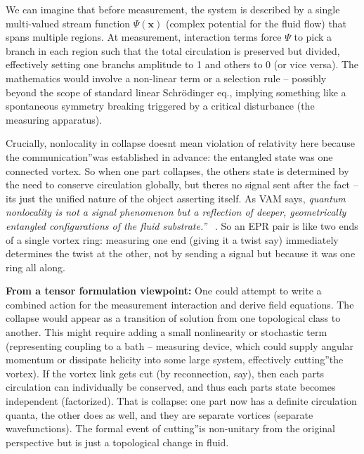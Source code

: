 \documentclass[a4paper, aps,preprint,superscriptaddress, 12pt]{revtex4}
\begin{document}
We can imagine that before measurement, the system is described by a single multi-valued stream function $\Psi(\mathbf{x})$ (complex potential for the fluid flow) that spans multiple regions. At measurement, interaction terms force $\Psi$ to pick a branch in each region such that the total circulation is preserved but divided, effectively setting one branch\rqs s amplitude to 1 and others to 0 (or vice versa). The mathematics would involve a non-linear term or a selection rule – possibly beyond the scope of standard linear Schrödinger eq., implying something like a spontaneous symmetry breaking triggered by a critical disturbance (the measuring apparatus).


Crucially, nonlocality in collapse doesn\rqs t mean violation of relativity here because the \grqq communication\textquotedblright was established in advance: the entangled state was one connected vortex. So when one part collapses, the other\rqs s state is determined by the need to conserve circulation globally, but there\rqs s no signal sent after the fact – it\rqs s just the unified nature of the object asserting itself. As VAM says, \textit{\grqq quantum nonlocality is not a signal phenomenon but a reflection of deeper, geometrically entangled configurations of the fluid substrate.\textquotedblright}~\cite{Iskandarani2025c} . So an EPR pair is like two ends of a single vortex ring: measuring one end (giving it a twist say) immediately determines the twist at the other, not by sending a signal but because it was one ring all along.


\textbf{From a tensor formulation viewpoint:} One could attempt to write a combined action for the measurement interaction and derive field equations. The collapse would appear as a transition of solution from one topological class to another. This might require adding a small nonlinearity or stochastic term (representing coupling to a bath – measuring device, which could supply angular momentum or dissipate helicity into some large system, effectively \grqq cutting\textquotedblright the vortex). If the vortex link gets cut (by reconnection, say), then each part\rqs s circulation can individually be conserved, and thus each part\rqs s state becomes independent (factorized). That is collapse: one part now has a definite circulation quanta, the other does as well, and they are separate vortices (separate wavefunctions). The formal event of \grqq cutting\textquotedblright is non-unitary from the original perspective but is just a topological change in fluid.
\end{document}
